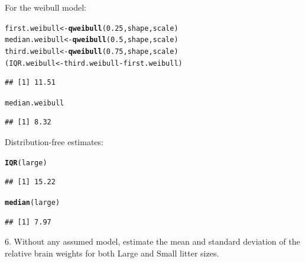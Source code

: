 \documentclass{article}\usepackage{graphicx, color}
\makeatletter
\newcommand{\hlfunctioncall}[1]{\textcolor[rgb]{0.501960784313725,0,0.329411764705882}{\textbf{#1}}}%
\newenvironment{kframe}{%
 \def\at@end@of@kframe{}%
 \ifinner\ifhmode%
  \def\at@end@of@kframe{\end{minipage}}%
  \begin{minipage}{\columnwidth}%
 \fi\fi%
 \def\FrameCommand##1{\hskip\@totalleftmargin \hskip-\fboxsep
 \colorbox{shadecolor}{##1}\hskip-\fboxsep
     \hskip-\linewidth \hskip-\@totalleftmargin \hskip\columnwidth}%
 \MakeFramed {\advance\hsize-\width
   \@totalleftmargin\z@ \linewidth\hsize
   \@setminipage}}%
 {\par\unskip\endMakeFramed%
 \at@end@of@kframe}
\newenvironment{knitrout}{}{} %
\makeatother
\begin{document}
\begin{shaded}
For the weibull model:
\begin{knitrout}
\color{fgcolor}\begin{kframe}
\begin{alltt}
first.weibull <- \hlfunctioncall{qweibull}(0.25, shape, scale)
median.weibull <- \hlfunctioncall{qweibull}(0.5, shape, scale)
third.weibull <- \hlfunctioncall{qweibull}(0.75, shape, scale)
(IQR.weibull <- third.weibull - first.weibull)
\end{alltt}
\begin{verbatim}
## [1] 11.51
\end{verbatim}
\begin{alltt}
median.weibull
\end{alltt}
\begin{verbatim}
## [1] 8.32
\end{verbatim}
\end{kframe}
\end{knitrout}

\end{shaded}
Distribution-free estimates:
\begin{shaded}
\begin{knitrout}
\color{fgcolor}\begin{kframe}
\begin{alltt}
\hlfunctioncall{IQR}(large)
\end{alltt}
\begin{verbatim}
## [1] 15.22
\end{verbatim}
\begin{alltt}
\hlfunctioncall{median}(large)
\end{alltt}
\begin{verbatim}
## [1] 7.97
\end{verbatim}
\end{kframe}
\end{knitrout}


\end{shaded}
\item[6.] Without any assumed model, estimate the mean and standard deviation of the relative brain weights for both Large and Small litter sizes.
\end{document}
